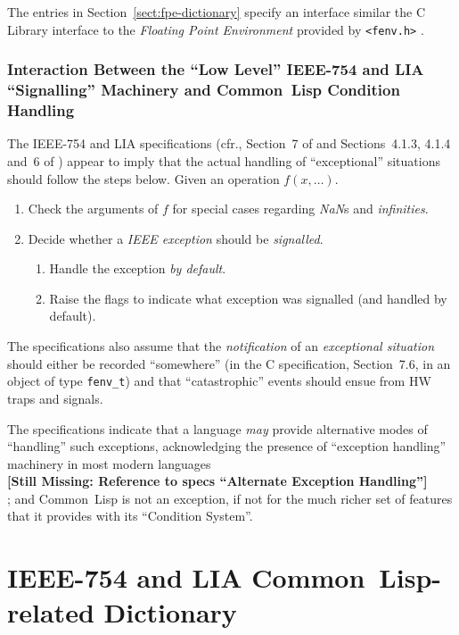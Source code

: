 \documentclass[10pt,fleqn]{article}
\newcommand{\CL}{\textsf{Common~Lisp}}
\newcommand{\CLang}{\textsf{C}}
\newcommand{\missingpart}[1]{{\ }\vspace{2mm}\\
{\textbf{[Still Missing: #1]}}\\
\vspace{2mm}}
\newcommand{\code}[1]{\texttt{#1}}
\newcommand{\clieeeterm}[1]{\textit{#1}}
\newcommand{\IEEEFPStd}{IEEE-754}
\begin{document}
The entries in Section~\ref{sect:fpe-dictionary} specify an interface
similar the \CLang{} Library interface to the \emph{Floating Point
  Environment} provided by \verb|<fenv.h>| \cite{2018:C18}.


\subsubsection{Interaction Between the ``Low Level'' \IEEEFPStd{} and LIA
  ``Signalling'' Machinery and \CL{} Condition Handling}

The \IEEEFPStd{} and LIA specifications (cfr., Section~7 of
\cite{2008:IEEE-754} and Sections~4.1.3, 4.1.4 and~6 of
\cite{2012:LIA1}) appear to imply that the actual handling of
``exceptional'' situations should follow the steps below.  Given an
operation $f(x, \ldots)$.

\begin{enumerate}
\item Check the arguments of $f$ for special cases regarding
  \clieeeterm{NaN}s and \clieeeterm{infinities}.
\item Decide whether a \clieeeterm{IEEE exception} should be
  \emph{signalled}.
  \begin{enumerate}
  \item Handle the exception \emph{by default}.
  \item Raise the flags to indicate what exception was signalled (and
    handled by default).
  \end{enumerate}
\end{enumerate}

The specifications also assume that the \emph{notification} of an
\emph{exceptional situation} should either be recorded ``somewhere''
(in the \CLang{} specification, Section~7.6, in an object of type
\code{fenv\_t}) and that ``catastrophic'' events should ensue from HW
traps and signals.

The specifications indicate that a language \emph{may} provide
alternative modes of ``handling'' such exceptions, acknowledging the
presence of ``exception handling'' machinery in most modern languages
\missingpart{Reference to specs ``Alternate Exception Handling''};
and \CL{} is not an exception, if not for the much richer set of
features that it provides with its ``Condition System''.




\section{\IEEEFPStd{} and LIA \CL{}-related Dictionary}
\end{document}
